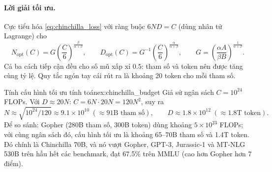 \paragraph{Lời giải tối ưu.} Cực tiểu hóa \eqref{eq:chinchilla_loss} với ràng buộc $6ND = C$ (dùng nhân tử Lagrange) cho
\[
N_{\text{opt}}(C) = G\left(\frac{C}{6}\right)^{\frac{\beta}{\alpha+\beta}}, \qquad
D_{\text{opt}}(C) = G^{-1}\left(\frac{C}{6}\right)^{\frac{\alpha}{\alpha+\beta}}, \qquad
G = \left(\frac{\alpha A}{\beta B}\right)^{\frac{1}{\alpha+\beta}}.
\]
Cả ba cách tiếp cận đều cho số mũ xấp xỉ $0.5$: tham số và token nên được tăng cùng tỷ lệ. Quy tắc ngón tay cái rút ra là khoảng 20 token cho mỗi tham số.

\begin{example}{Tính cấu hình tối ưu tính toán}{ex:chinchilla_budget}
Giả sử ngân sách $C = 10^{24}$ FLOPs. Với $D \approx 20N$: $C = 6N \cdot 20N = 120N^2$, suy ra
\[
N \approx \sqrt{10^{24}/120} \approx 9.1 \times 10^{10} \;(\approx 91\text{B tham số}), \qquad D \approx 1.8 \times 10^{12} \;(\approx 1.8\text{T token}).
\]
Để so sánh: Gopher (280B tham số, 300B token) dùng khoảng $5 \times 10^{23}$ FLOPs; với cùng ngân sách đó, cấu hình tối ưu là khoảng 65--70B tham số và 1.4T token. Đó chính là Chinchilla 70B, và nó vượt Gopher, GPT-3, Jurassic-1 và MT-NLG 530B trên hầu hết các benchmark, đạt 67.5\% trên MMLU (cao hơn Gopher hơn 7 điểm).
\end{example}

\begin{center}
\label{fig:chinchilla_isoflop}
\end{center}

